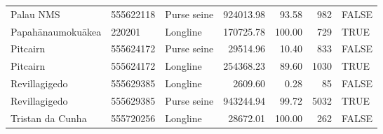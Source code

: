 \begin{table}
\begin{tabular}[t]{lllrrrl}
Palau NMS & 555622118 & Purse seine & 924013.98 & 93.58 & 982 & FALSE\\
\addlinespace
Papahānaumokuākea & 220201 & Longline & 170725.78 & 100.00 & 729 & TRUE\\
Pitcairn & 555624172 & Purse seine & 29514.96 & 10.40 & 833 & FALSE\\
Pitcairn & 555624172 & Longline & 254368.23 & 89.60 & 1030 & TRUE\\
Revillagigedo & 555629385 & Longline & 2609.60 & 0.28 & 85 & FALSE\\
Revillagigedo & 555629385 & Purse seine & 943244.94 & 99.72 & 5032 & TRUE\\
\addlinespace
Tristan da Cunha & 555720256 & Longline & 28672.01 & 100.00 & 262 & FALSE\\
\bottomrule
\end{tabular}
\end{table}
